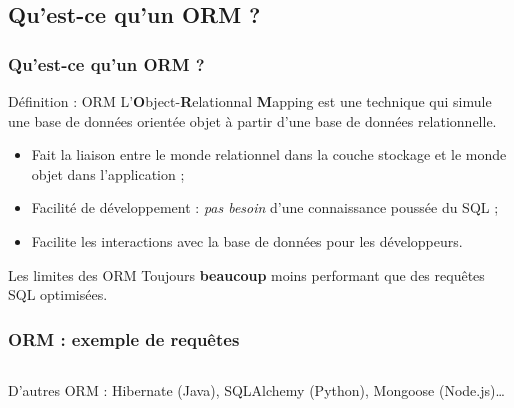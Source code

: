 	\subsection{Qu'est-ce qu'un ORM ?}
	\begin{frame}
		\frametitle{Qu'est-ce qu'un ORM ?}

		\begin{block}{Définition : ORM}
			L'\textbf{O}bject-\textbf{R}elationnal \textbf{M}apping est une technique qui simule une base de données orientée objet à partir d'une base de données relationnelle.
		\end{block}

		\vspace{2px}

		\begin{itemize}
			\item Fait la liaison entre le monde relationnel dans la couche stockage et le monde objet dans l'application ;
			\item Facilité de développement : \textit{pas besoin} d'une connaissance poussée du SQL ;
			\item Facilite les interactions avec la base de données pour les développeurs.
		\end{itemize}

		\vspace{2px}

		\begin{alertblock}{Les limites des ORM}
			Toujours \textbf{beaucoup} moins performant que des requêtes SQL optimisées.
		\end{alertblock}
	\end{frame}

	\begin{frame}
		\frametitle{ORM : exemple de requêtes}

		\begin{listing}[H]
			\inputminted[fontsize=\tiny, linenos=true]{php}{code/eloquent.php}
			\caption{Quelques requêtes basiques avec l'ORM Eloquent (PHP).}
		\end{listing}

		\scriptsize{D'autres ORM : Hibernate (Java), SQLAlchemy (Python), Mongoose (Node.js)\dots}
	\end{frame}